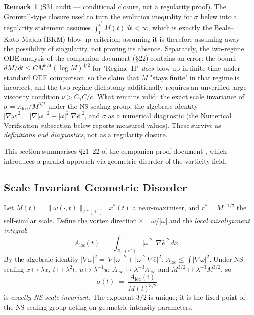 \documentclass[11pt]{article}
\theoremstyle{definition}
\newtheorem{remark}[theorem]{Remark}
\theoremstyle{remark}
\newcommand{\T}{\mathbb{T}}
\begin{document}
\begin{remark}[S31 audit --- conditional closure, not a regularity proof]
The Gronwall-type closure used to turn the evolution inequality for $\sigma$ below
into a regularity statement assumes $\int_0^{t^*}M(t)\,dt<\infty$, which is exactly
the Beale--Kato--Majda (BKM) blow-up criterion; assuming it is therefore assuming
away the possibility of singularity, not proving its absence.  Separately, the
two-regime ODE analysis of the companion document (§22) contains an error:
the bound $dM/dt\leq CM^{5/4}(\log M)^{1/2}$ for "Regime~II" \emph{does} blow up
in finite time under standard ODE comparison, so the claim that $M$ "stays finite"
in that regime is incorrect, and the two-regime dichotomy additionally requires an
unverified large-viscosity condition $\nu>C_1C/c$.  What remains valid: the exact
scale invariance of $\sigma=A_{\mathrm{loc}}/M^{3/2}$ under the NS scaling group,
the algebraic identity $|\nabla\omega|^2=|\nabla|\omega||^2+|\omega|^2|\nabla\hat e|^2$,
and $\sigma$ as a numerical diagnostic (the Numerical Verification subsection
below reports measured values).  These survive as \emph{definitions and
diagnostics}, not as a regularity closure.
\end{remark}

This section summarises §21--22 of the companion proof document \cite{TFirstProof2026},
which introduces a parallel approach via geometric disorder of the vorticity field.

\subsection{Scale-Invariant Geometric Disorder}

Let $M(t)=\|\omega(\cdot,t)\|_{L^\infty(\T^3)}$, $x^*(t)$ a near-maximiser,
and $r^* = M^{-1/2}$ the self-similar scale.  Define the vortex direction
$\hat{e} = \omega/|\omega|$ and the \emph{local misalignment integral}:
\[
  A_{\mathrm{loc}}(t) \;=\; \int_{B_{r^*}(x^*)} |\omega|^2\,|\nabla\hat{e}|^2\,dx.
\]
By the algebraic identity $|\nabla\omega|^2 = |\nabla|\omega||^2 + |\omega|^2|\nabla\hat{e}|^2$:
$A_{\mathrm{loc}}\leq \int|\nabla\omega|^2$.
Under NS scaling $x\mapsto\lambda x$, $t\mapsto\lambda^2 t$, $u\mapsto\lambda^{-1}u$:
$A_{\mathrm{loc}}\mapsto\lambda^{-3}A_{\mathrm{loc}}$ and $M^{3/2}\mapsto\lambda^{-3}M^{3/2}$,
so
\[
  \sigma(t) \;=\; \frac{A_{\mathrm{loc}}(t)}{M(t)^{3/2}}
\]
is \emph{exactly NS scale-invariant}.  The exponent $3/2$ is unique; it is the fixed
point of the NS scaling group acting on geometric intensity parameters.
\end{document}

